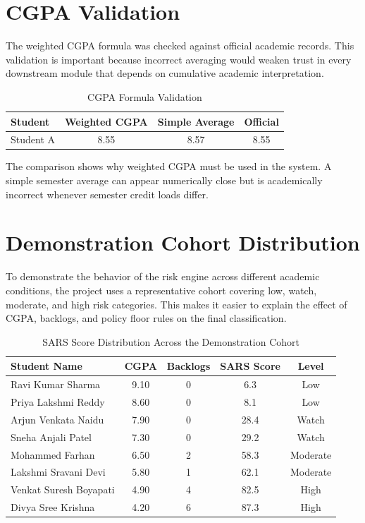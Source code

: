 \section{CGPA Validation}
The weighted CGPA formula was checked against official academic records. This validation is important because incorrect averaging would weaken trust in every downstream module that depends on cumulative academic interpretation.

\begin{table}[H]
\centering
\caption{CGPA Formula Validation}
\begin{tabular}{lccc}
\toprule
\textbf{Student} & \textbf{Weighted CGPA} & \textbf{Simple Average} & \textbf{Official} \\
\midrule
Student A & 8.55 & 8.57 & 8.55 \\
\bottomrule
\end{tabular}
\end{table}

The comparison shows why weighted CGPA must be used in the system. A simple semester average can appear numerically close but is academically incorrect whenever semester credit loads differ.

\section{Demonstration Cohort Distribution}
To demonstrate the behavior of the risk engine across different academic conditions, the project uses a representative cohort covering low, watch, moderate, and high risk categories. This makes it easier to explain the effect of CGPA, backlogs, and policy floor rules on the final classification.

\begin{table}[H]
\centering
\caption{SARS Score Distribution Across the Demonstration Cohort}
\begin{tabular}{lcccc}
\toprule
\textbf{Student Name} & \textbf{CGPA} & \textbf{Backlogs} & \textbf{SARS Score} & \textbf{Level} \\
\midrule
Ravi Kumar Sharma & 9.10 & 0 & 6.3 & Low \\
Priya Lakshmi Reddy & 8.60 & 0 & 8.1 & Low \\
Arjun Venkata Naidu & 7.90 & 0 & 28.4 & Watch \\
Sneha Anjali Patel & 7.30 & 0 & 29.2 & Watch \\
Mohammed Farhan & 6.50 & 2 & 58.3 & Moderate \\
Lakshmi Sravani Devi & 5.80 & 1 & 62.1 & Moderate \\
Venkat Suresh Boyapati & 4.90 & 4 & 82.5 & High \\
Divya Sree Krishna & 4.20 & 6 & 87.3 & High \\
\bottomrule
\end{tabular}
\end{table}

